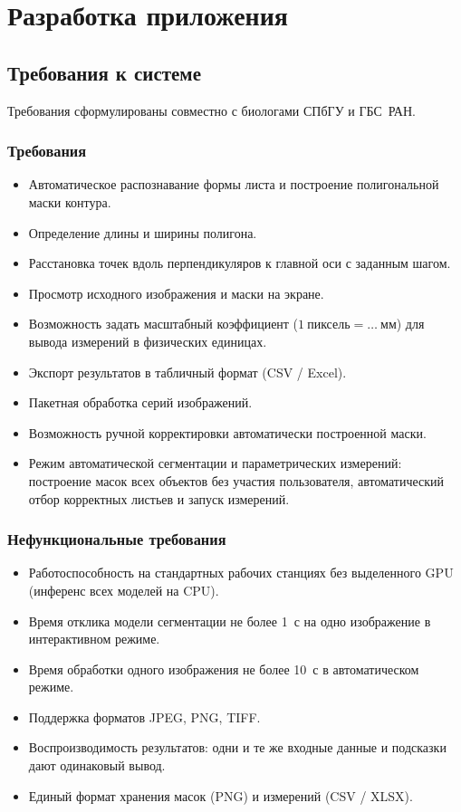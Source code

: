 
\section{Разработка приложения}
\label{sec:solution}

\subsection{Требования к системе}
\label{sec:requirements}

Требования сформулированы совместно с биологами СПбГУ и ГБС~РАН.

\subsubsection*{Требования}

\begin{itemize}
    \item Автоматическое распознавание формы листа и построение полигональной маски контура.
    \item Определение длины и ширины полигона.
    \item Расстановка точек вдоль перпендикуляров к главной оси с заданным шагом.
    \item Просмотр исходного изображения и маски на экране.
    \item Возможность задать масштабный коэффициент ($1~\text{пиксель} = \ldots~\text{мм}$) для вывода измерений в физических единицах.
    \item Экспорт результатов в табличный формат (CSV / Excel).
    \item Пакетная обработка серий изображений.
    \item Возможность ручной корректировки автоматически построенной маски.
    \item Режим автоматической сегментации и параметрических измерений: построение масок всех объектов без участия пользователя, автоматический отбор корректных листьев и запуск измерений.
\end{itemize}

\subsubsection*{Нефункциональные требования}

\begin{itemize}
    \item Работоспособность на стандартных рабочих станциях без выделенного GPU (инференс всех моделей на CPU).
    \item Время отклика модели сегментации не более 1~с на одно изображение в интерактивном режиме.
    \item Время обработки одного изображения не более 10~с в автоматическом режиме.
    \item Поддержка форматов JPEG, PNG, TIFF.
    \item Воспроизводимость результатов: одни и те же входные данные и подсказки дают одинаковый вывод.
    \item Единый формат хранения масок (PNG) и измерений (CSV / XLSX).
\end{itemize}


